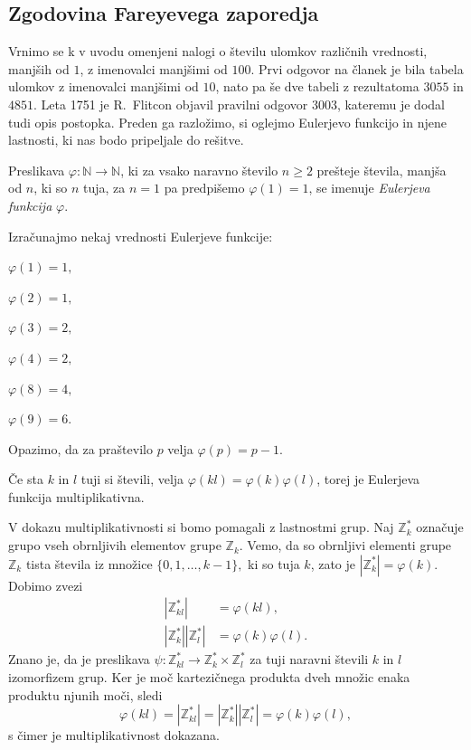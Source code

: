 \documentclass[mat1]{fmfdelo}
\begin{document}
%
\subsection{Zgodovina Fareyevega zaporedja}

Vrnimo se k v uvodu omenjeni nalogi o številu ulomkov različnih vrednosti, manjših od $1$, z imenovalci manjšimi od $100$. Prvi odgovor na članek je bila tabela ulomkov z imenovalci manjšimi od $10$, nato pa še dve tabeli z rezultatoma $3055$ in $4851$. Leta 1751 je R.~Flitcon objavil pravilni odgovor $3003$, kateremu je dodal tudi opis postopka. Preden ga razložimo, si oglejmo Eulerjevo funkcijo in njene lastnosti, ki nas bodo pripeljale do rešitve. 
%

\begin{definicija}
Preslikava \( \varphi \colon \mathbb{N} \rightarrow \mathbb{N}\), ki za vsako naravno število $n \geq 2$ prešteje števila, manjša od $n$, ki so $n$ tuja, za $n=1$ pa predpišemo $\varphi(1) = 1$, se imenuje \emph{Eulerjeva funkcija} $\varphi$.
\end{definicija}

\begin{primer}
Izračunajmo nekaj vrednosti Eulerjeve funkcije:

\( \varphi(1) = 1, \)

\( \varphi(2) = 1, \)

\( \varphi(3) = 2, \)

\( \varphi(4) = 2, \)

\( \varphi(8) = 4, \)

\( \varphi(9) = 6. \)

Opazimo, da za praštevilo $p$ velja $\varphi(p) = p-1.$
\end{primer}

\begin{trditev}
\label{trd:MultipEuler}
Če sta $k$ in $l$ tuji si števili, velja $\varphi (kl) = \varphi (k) \varphi (l)$, torej je Eulerjeva funkcija multiplikativna.
\end{trditev}

\begin{dokaz}
V dokazu multiplikativnosti si bomo pomagali z lastnostmi grup. 
Naj $\mathbb{Z}_{k}^\ast $ označuje grupo vseh obrnljivih elementov grupe $\mathbb{Z}_{k}$. Vemo, da so obrnljivi elementi grupe $\mathbb{Z}_{k}$ tista števila iz množice \( \{0, 1, \ldots, k-1 \}, \) ki so tuja $k$, zato je $|\mathbb{Z}_{k}^\ast| = \varphi(k).$  
Dobimo zvezi
\begin{align*}
|\mathbb{Z}_{kl}^\ast| &= \varphi(kl), \\
|\mathbb{Z}_{k}^\ast| |\mathbb{Z}_{l}^\ast| &= \varphi(k) \varphi(l).
\end{align*}
Znano je, da je preslikava \( \psi \colon \mathbb{Z}_{kl}^\ast \rightarrow \mathbb{Z}_{k}^\ast \times \mathbb{Z}_{l}^\ast \) za tuji naravni števili $k$ in $l$ izomorfizem grup. Ker je moč kartezičnega produkta dveh množic enaka produktu njunih moči, sledi 
\[ \varphi(kl) = |\mathbb{Z}_{kl}^\ast| = |\mathbb{Z}_{k}^\ast| |\mathbb{Z}_{l}^\ast| = \varphi(k) \varphi(l), \]
s čimer je multiplikativnost dokazana.
\end{dokaz}
\end{document}

